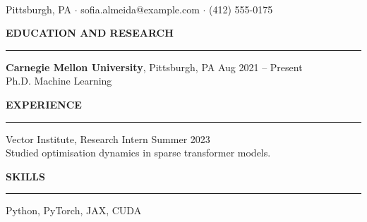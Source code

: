\documentclass[letterpaper,11pt]{article}
\newcommand{\heading}[1]{\vspace{6pt}\textbf{#1}\vspace{2pt}\hrule\vspace{3pt}}
\begin{document}
\\
Pittsburgh, PA $\cdot$ sofia.almeida@example.com $\cdot$ (412) 555-0175

\heading{EDUCATION AND RESEARCH}
\noindent \textbf{Carnegie Mellon University}, Pittsburgh, PA \hfill Aug 2021 -- Present\\
Ph.D. Machine Learning

\heading{EXPERIENCE}
\noindent Vector Institute, Research Intern \hfill Summer 2023\\
Studied optimisation dynamics in sparse transformer models.

\heading{SKILLS}
\noindent Python, PyTorch, JAX, CUDA
\end{document}
